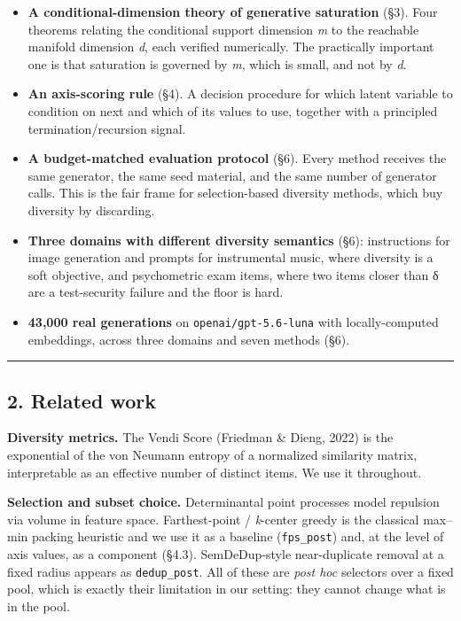 \documentclass[
  11pt,
]{article}
\providecommand{\tightlist}{%
  \setlength{\itemsep}{0pt}\setlength{\parskip}{0pt}}
\theoremstyle{plain}
\theoremstyle{definition}
\providecommand{\tightlist}{%
  \setlength{\itemsep}{0pt}\setlength{\parskip}{0pt}}
\begin{document}
\begin{itemize}
\tightlist
\item
  \textbf{A conditional-dimension theory of generative saturation} (§3).
  Four theorems relating the conditional support dimension \emph{m} to
  the reachable manifold dimension \emph{d}, each verified numerically.
  The practically important one is that saturation is governed by
  \emph{m}, which is small, and not by \emph{d}.
\item
  \textbf{An axis-scoring rule} (§4). A decision procedure for which
  latent variable to condition on next and which of its values to use,
  together with a principled termination/recursion signal.
\item
  \textbf{A budget-matched evaluation protocol} (§6). Every method
  receives the same generator, the same seed material, and the same
  number of generator calls. This is the fair frame for selection-based
  diversity methods, which buy diversity by discarding.
\item
  \textbf{Three domains with different diversity semantics} (§6):
  instructions for image generation and prompts for instrumental music,
  where diversity is a soft objective, and psychometric exam items,
  where two items closer than δ are a test-security failure and the
  floor is hard.
\item
  \textbf{43,000 real generations} on \texttt{openai/gpt-5.6-luna} with
  locally-computed embeddings, across three domains and seven methods
  (§6).
\end{itemize}

\begin{center}\rule{0.5\linewidth}{0.5pt}\end{center}

\subsection{2. Related work}\label{2-related-work}

\textbf{Diversity metrics.} The Vendi Score (Friedman \& Dieng, 2022) is
the exponential of the von Neumann entropy of a normalized similarity
matrix, interpretable as an effective number of distinct items. We use
it throughout.

\textbf{Selection and subset choice.} Determinantal point processes
model repulsion via volume in feature space. Farthest-point /
\emph{k}-center greedy is the classical max--min packing heuristic and
we use it as a baseline (\texttt{fps\_post}) and, at the level of axis
values, as a component (§4.3). SemDeDup-style near-duplicate removal at
a fixed radius appears as \texttt{dedup\_post}. All of these are
\emph{post hoc} selectors over a fixed pool, which is exactly their
limitation in our setting: they cannot change what is in the pool.
\end{document}
